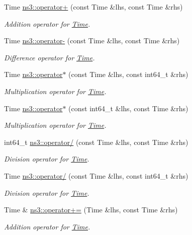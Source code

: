 \begin{DoxyCompactItemize}
Time \hyperlink{group__time_ga932570c711bf1b5966beebd196f66fec}{ns3\+::operator+} (const Time \&lhs, const Time \&rhs)
\begin{DoxyCompactList}\small\item\em Addition operator for \hyperlink{classns3_1_1Time}{Time}. \end{DoxyCompactList}\item 
Time \hyperlink{group__time_ga694050f08b35f2fc60a55d9d77bc3cdd}{ns3\+::operator-\/} (const Time \&lhs, const Time \&rhs)
\begin{DoxyCompactList}\small\item\em Difference operator for \hyperlink{classns3_1_1Time}{Time}. \end{DoxyCompactList}\item 
Time \hyperlink{group__time_ga3c4323c1d49d59af0c77f47eb52bc604}{ns3\+::operator$\ast$} (const Time \&lhs, const int64\+\_\+t \&rhs)
\begin{DoxyCompactList}\small\item\em Multiplication operator for \hyperlink{classns3_1_1Time}{Time}. \end{DoxyCompactList}\item 
Time \hyperlink{group__time_ga305b799d2eeca7a4264a8a83870fe572}{ns3\+::operator$\ast$} (const int64\+\_\+t \&lhs, const Time \&rhs)
\begin{DoxyCompactList}\small\item\em Multiplication operator for \hyperlink{classns3_1_1Time}{Time}. \end{DoxyCompactList}\item 
int64\+\_\+t \hyperlink{group__time_ga03dd9f9dc403d0cd6c2fbf6237acf52e}{ns3\+::operator/} (const Time \&lhs, const Time \&rhs)
\begin{DoxyCompactList}\small\item\em Division operator for \hyperlink{classns3_1_1Time}{Time}. \end{DoxyCompactList}\item 
Time \hyperlink{group__time_gad9aa73be031a049608d6735dfc5ddad8}{ns3\+::operator/} (const Time \&lhs, const int64\+\_\+t \&rhs)
\begin{DoxyCompactList}\small\item\em Division operator for \hyperlink{classns3_1_1Time}{Time}. \end{DoxyCompactList}\item 
Time \& \hyperlink{group__time_ga43ba447aaff4ad79edebd8201ed4fa0d}{ns3\+::operator+=} (Time \&lhs, const Time \&rhs)
\begin{DoxyCompactList}\small\item\em Addition operator for \hyperlink{classns3_1_1Time}{Time}. \end{DoxyCompactList}\item 

\end{DoxyCompactItemize}
